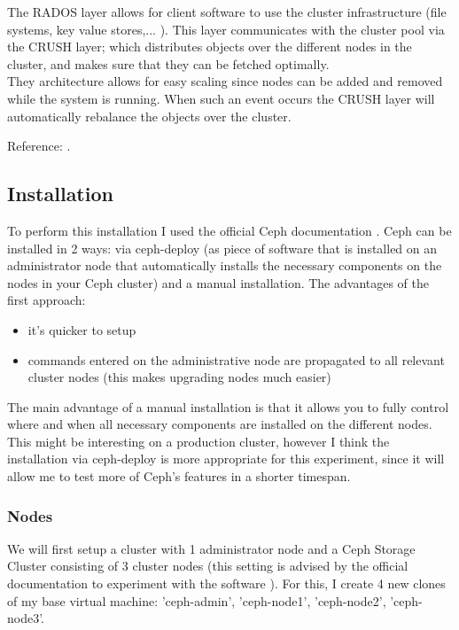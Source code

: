 \documentclass[12pt]{report}
\begin{document}
The RADOS layer allows for client software to use the cluster
infrastructure  (file systems, key value stores,... ). This layer
communicates with the cluster pool via the CRUSH layer; which
distributes objects over the different nodes in the cluster, and makes
sure that they can be fetched optimally. \\
They architecture allows for easy scaling since nodes can be added and
removed while the system is running. When such an event occurs the
CRUSH layer will automatically rebalance the objects over the cluster.

Reference: \cite{ceph_developerworks}.

\subsection{Installation}
To perform this installation I used the official Ceph documentation \cite{ceph_official_doc}.
Ceph can be installed in 2 ways: via ceph-deploy (as piece of software
that is installed on an administrator node that automatically installs the
necessary components on the nodes in your Ceph cluster) and a
manual installation.
The advantages of the first approach:
\begin{itemize}
\item it's quicker to setup
\item commands entered on the administrative node are 
  propagated to all relevant cluster nodes (this makes upgrading nodes
  much easier)
\end{itemize}
The main advantage of a manual installation is that it allows you to
fully control where and when all necessary components are installed on the different
nodes. 
This might be interesting on a production cluster, however I think the
installation via ceph-deploy is more appropriate for this experiment, since it will
allow me to test more of Ceph's features in a shorter timespan.

\subsubsection{Nodes}
We will first setup a cluster with 1 administrator node and a Ceph
Storage Cluster consisting of 3 cluster nodes (this setting is advised
by the official documentation to experiment with the software \cite{ceph_official_doc}).
For this, I create 4 new clones of my base virtual machine:
'ceph-admin', 'ceph-node1', 'ceph-node2', 'ceph-node3'.
\end{document}
